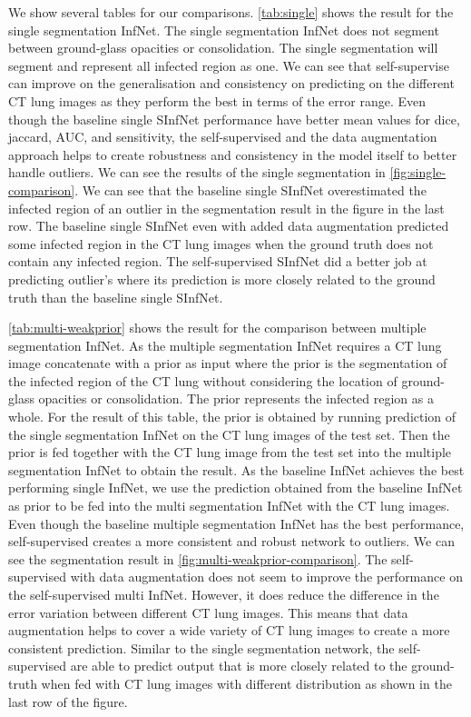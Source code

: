  We show several tables for our comparisons. \ref{tab:single} shows the result for the single segmentation InfNet. The single segmentation InfNet does not segment between ground-glass opacities or consolidation. The single segmentation will segment and represent all infected region as one. We can see that self-supervise can improve on the generalisation and consistency on predicting on the different CT lung images as they perform the best in terms of the error range. Even though the baseline single SInfNet performance have better mean values for dice, jaccard, AUC, and sensitivity, the self-supervised and the data augmentation approach helps to create robustness and consistency in the model itself to better handle outliers. We can see the results of the single segmentation in \ref{fig:single-comparison}. We can see that the baseline single SInfNet overestimated the infected region of an outlier in the segmentation result in the figure in the last row. The baseline single SInfNet even with added data augmentation predicted some infected region in the CT lung images when the ground truth does not contain any infected region. The self-supervised SInfNet did a better job at predicting outlier's where its prediction is more closely related to the ground truth than the baseline single SInfNet.
 
 \ref{tab:multi-weakprior} shows the result for the comparison between multiple segmentation InfNet. As the multiple segmentation InfNet requires a CT lung image concatenate with a prior as input where the prior is the segmentation of the infected region of the CT lung without considering the location of ground-glass opacities or consolidation. The prior represents the infected region as a whole. For the result of this table, the prior is obtained by running prediction of the single segmentation InfNet on the CT lung images of the test set. Then the prior is fed together with the CT lung image from the test set into the multiple segmentation InfNet to obtain the result. As the baseline InfNet achieves the best performing single InfNet, we use the prediction obtained from the baseline InfNet as prior to be fed into the multi segmentation InfNet with the CT lung images. Even though the baseline multiple segmentation InfNet has the best performance, self-supervised  creates a more consistent and robust network to outliers. We can see the segmentation result in \ref{fig:multi-weakprior-comparison}. The self-supervised with data augmentation does not seem to improve the performance on the self-supervised multi InfNet. However, it does reduce the difference in the error variation between different CT lung images. This means that data augmentation helps to cover a wide variety of CT lung images to create a more consistent prediction. Similar to the single segmentation network, the self-supervised are able to predict output that is more closely related to the ground-truth when fed with CT lung images with different distribution as shown in the last row of the figure. 
   
